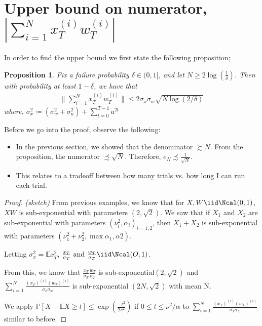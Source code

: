 \documentclass{article}[12pt]
\newtheorem{prop}{Proposition}
\def \E{\mathbb E}
\def \P{\mathbb P}
\begin{document}
\section{Upper bound on numerator, $|\sum_{i=1}^{N} x_T^{(i)} w_T^{(i)}| $}

In order to find the upper bound we first state the following proposition;
\begin{prop}
	\label{prop:ub}
	Fix a failure probability $\delta \in (0, 1]$, and let $ N \geq 2\log(\frac{1}{\delta})$.
	Then with probability at least $1-\delta$, we have that
	\begin{align}
	\lVert \sum_{i=1}^{N} x_T^{(i)}w_T^{(i)}  \rVert \leq 2\sigma_x\sigma_w \sqrt{N\log(2/\delta)} 
	\end{align}
	where, $\sigma_x^2 \coloneqq (\sigma_w^2 + \sigma_u^2) + \sum_{t=0 }^{T-1} a^{2t}$
\end{prop}

Before we go into the proof, observe the following:
\begin{itemize}
	\item In the previous section, we showed that the denominator $\succsim N$. 
	From the proposition, the numerator  $\precsim \sqrt{N}$. 
	Therefore, $e_N \precsim \frac{1}{\sqrt{N}}$. 
	\item This relates to a tradeoff between how many trials vs. how long I can run each trial. %
\end{itemize}
\begin{proof}
	\emph{(sketch)}
	From previous examples, we know that for $X,W \iid \Ncal(0,1)$, $XW$ is sub-exponential with parameters $(2,\sqrt{2})$. 
	We saw that if $X_1$ and $X_2$ are sub-exponential with parameters $(\nu^2_i, \alpha_i)_{i=1,2}$, then $X_1 +X_2$ is sub-exponential with parameters $(\nu_1^2 + \nu_2^2, \max{\alpha_1, \alpha2})$. 
	
	Letting $\sigma_x^2 = \E x^2_T$,
	$
	\frac{x_T}{\sigma_T} \text{ and } \frac{w_T}{\sigma_T} \iid \Ncal(O,1)
	$.
	
	From this, we know that
	$\frac{x_T}{\sigma_T}\frac{w_T}{\sigma_T}$ is sub-exponential$(2,\sqrt{2})$ and 
	$\sum_{i=1}^{N}\frac{(x_T)^{(i)}(w_T)^{(i)}}{\sigma_x\sigma_w}$ is sub-exponential $(2N,\sqrt{2})$ with mean N.
	
	We apply $\P[X-\E X \geq t] \leq \exp(\frac{-t^2}{2\nu^2})$  if $0 \leq t \leq \nu^2/\alpha$ to $\sum_{i=1}^{N}\frac{(x_T)^(i)(w_T)^(i)}{\sigma_x\sigma_w}$ similar to before.
	
\end{proof}
\end{document}
